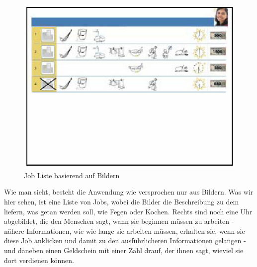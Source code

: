 \begin{figure}[h]
	\centering
		\includegraphics{Daten/job_list.PNG}
	\caption{Job Liste basierend auf Bildern}
	\label{fig:joblist}
\end{figure}

Wie man sieht, besteht die Anwendung wie versprochen nur aus Bildern. Was wir hier sehen, ist eine Liste von Jobs, wobei die Bilder die Beschreibung zu dem liefern, was getan werden soll, wie Fegen oder Kochen. Rechts sind noch eine Uhr abgebildet, die den Menschen sagt, wann sie beginnen müssen zu arbeiten - nähere Informationen, wie wie lange sie arbeiten müssen, erhalten sie, wenn sie diese Job anklicken und damit zu den ausführlicheren Informationen gelangen - und daneben einen Geldschein mit einer Zahl drauf, der ihnen sagt, wieviel sie dort verdienen können.
 
